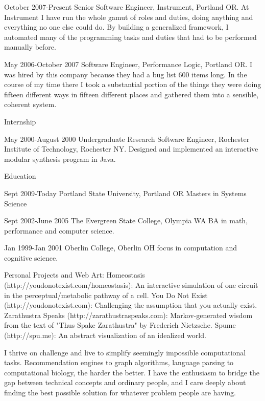 October 2007-Present  Senior Software Engineer, Instrument, Portland OR.  At Instrument I have run the whole gamut of roles and duties, doing anything and everything no one else could do.  By building a generalized framework, I automated many of the programming tasks and duties that had to be performed manually before.  

May 2006-October 2007  Software Engineer, Performance Logic, Portland OR.  I was hired by this company because they had a bug list 600 items long.  In the course of my time there I took a substantial portion of the things they were doing fifteen different ways in fifteen different places and gathered them into a sensible, coherent system.


Internship

May 2000-August 2000  Undergraduate Research Software Engineer, Rochester Institute of Technology, Rochester NY.  Designed and implemented an interactive modular synthesis program in Java. 


Education

Sept 2009-Today  Portland State University, Portland OR
Masters in Systems Science

Sept 2002-June 2005  The Evergreen State College, Olympia WA
BA in math, performance and computer science.

Jan 1999-Jan 2001  Oberlin College, Oberlin OH
focus in computation and cognitive science.


Personal Projects and Web Art:
  Homeostasis (http://youdonotexist.com/homeostasis): An interactive simulation of one circuit in the perceptual/metabolic pathway of a cell.
  You Do Not Exist (http://youdonotexist.com): Challenging the assumption that you actually exist.
  Zarathustra Speaks (http://zarathustraspeaks.com): Markov-generated wisdom from the text of "Thus Spake Zarathustra" by Frederich Nietzsche.
  Spume (http://spu.me): An abstract visualization of an idealized world.

I thrive on challenge and live to simplify seemingly impossible computational tasks.  Recommendation engines to graph algorithms, language parsing to computational biology, the harder the better.  I have the enthusiasm to bridge the gap between technical concepts and ordinary people, and I care deeply about finding the best possible solution for whatever problem people are having.  

